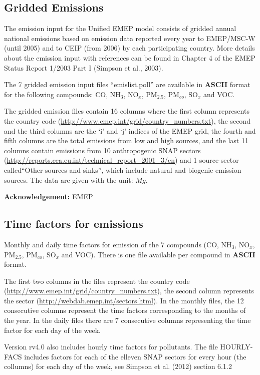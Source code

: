 \subsection{Gridded Emissions}
The emission input for the Unified EMEP model consists of gridded
annual national emissions based on emission data reported every year
to EMEP/MSC-W (until 2005) 
and to CEIP (from 2006) by each
participating country. 
More details about the emission input with references can be
found in Chapter 4 of the EMEP Status Report 1/2003 Part I 
(Simpson et al., 2003).

The 7 gridded emission input files ``emislist.poll'' are available in 
{\bf ASCII} format for the following compounds: CO, NH$_{3}$,
NO$_{x}$, PM$_{2.5}$, PM$_{co}$, SO$_{x}$ and VOC.

The gridded emission files contain 16 columns where the first column 
represents the country code
(\url{http://www.emep.int/grid/country_numbers.txt}), 
the second and the third columns are the `i' and `j' indices of the
EMEP grid, the fourth and fifth columns are the total emissions from
low and high sources, and the last 11 columns contain emissions from 
10 anthropogenic SNAP sectors 
(\url{http://reports.eea.eu.int/technical_report_2001_3/en}) and 1 
source-sector called``Other sources and sinks'', which include natural and
biogenic emission sources. The data are given with the unit: $Mg$.

{\bf Acknowledgement:} EMEP

\subsection{Time factors for emissions}

Monthly and daily time factors for emission of the 7 compounds 
(CO, NH$_{3}$, NO$_{x}$, PM$_{2.5}$, PM$_{co}$, SO$_{x}$ and VOC). 
There is one file available per compound in {\bf ASCII} format. 

The first two columns in the files represent the country code \\
(\url{http://www.emep.int/grid/country_numbers.txt}), the second column 
represents the sector (\url{http://webdab.emep.int/sectors.html}). In the monthly files, 
the 12 consecutive columns represent the time factors corresponding to 
the months of the year. In the daily files there are 7 consecutive columns representing 
the time factor for each day of the week. 

Version rv4.0 also includes hourly time factors for pollutants. The file HOURLY-FACS 
includes factors for each of the elleven SNAP sectors for every hour (the collumns) for 
each day of the week, see Simpson et al. (2012) section 6.1.2


